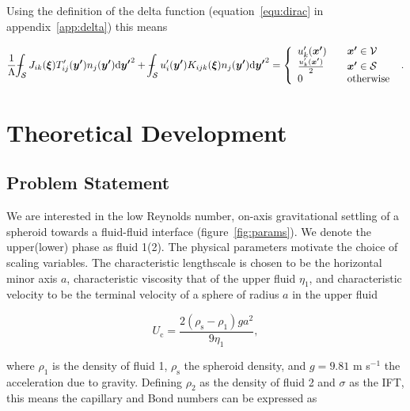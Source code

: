 \documentclass[12pt]{article}
\def\Xint#1{\mathchoice
{\XXint\displaystyle\textstyle{#1}}%
{\XXint\textstyle\scriptstyle{#1}}%
{\XXint\scriptstyle\scriptscriptstyle{#1}}%
{\XXint\scriptscriptstyle\scriptscriptstyle{#1}}%
\!\int}
\def\XXint#1#2#3{{\setbox0=\hbox{$#1{#2#3}{\int}$}
\vcenter{\hbox{$#2#3$}}\kern-.5\wd0}}
\def\dashint{\Xint-}
\begin{document}
Using the definition of the delta function (equation~\ref{equ:dirac} in appendix~\ref{app:delta}) this means

\begin{equation}
\label{equ:Stokes_int_domain}
\frac{1}{\Lambda} \dashint_{\mathcal{S}} J_{ik}(\boldsymbol{\xi}) T'_{ij}(\boldsymbol{y'}) n_{j}(\boldsymbol{y'}) \mathrm{d} \boldsymbol{y'}^{2} + \dashint_{\mathcal{S}} u'_{i}(\boldsymbol{y'}) K_{ijk}(\boldsymbol{\xi}) n_{j}(\boldsymbol{y'}) \mathrm{d} \boldsymbol{y'}^{2} = 
\left\{
    \begin{array}{l l}
      u'_{k}(\boldsymbol{x'}) &\quad \boldsymbol{x'} \in \mathcal{V} \\
      \frac{u'_{k}(\boldsymbol{x'})}{2} &\quad \boldsymbol{x'} \in \mathcal{S} \\
      0 & \quad \text{otherwise}
\end{array}
\right.\ .
\end{equation}

\section{Theoretical Development}
\label{sec:theory}

\subsection{Problem Statement}
\label{subsec:theory}

We are interested in the low Reynolds number, on-axis gravitational settling of a spheroid towards a fluid-fluid interface (figure~\ref{fig:params}). We denote the upper(lower) phase as fluid 1(2). The physical parameters motivate the choice of scaling variables. The characteristic lengthscale is chosen to be the horizontal minor axis $a$, characteristic viscosity that of the upper fluid $\eta_{1}$, and characteristic velocity to be the terminal velocity of a sphere of radius $a$ in the upper fluid\citep{Reynolds1886}

\begin{equation}
\label{equ:char_vel}
U_{\text{c}} = \frac{2 (\rho_{\text{s}} - \rho_{1}) g a^{2}}{9 \eta_{1}} ,
\end{equation}

where $\rho_{1}$ is the density of fluid 1, $\rho_{\text{s}}$ the spheroid density, and $g = 9.81$ m s$^{-1}$ the acceleration due to gravity. Defining $\rho_{2}$ as the density of fluid 2 and $\sigma$ as the IFT, this means the capillary and Bond numbers can be expressed as
\end{document}
